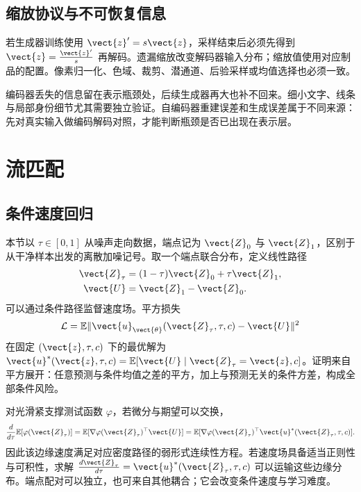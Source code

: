 \documentclass[../textbook.tex]{subfiles}
\begin{document}
\subsection{缩放协议与不可恢复信息}
若生成器训练使用 $\vect{z}'=s\vect{z}$，采样结束后必须先得到 $\vect{z}=\frac{\vect{z}'}{s}$ 再解码。遗漏缩放改变解码器输入分布；缩放值使用对应制品的配置。像素归一化、色域、裁剪、潜通道、后验采样或均值选择也必须一致。

编码器丢失的信息留在表示瓶颈处，后续生成器再大也补不回来。细小文字、线条与局部身份细节尤其需要独立验证。自编码器重建误差和生成误差属于不同来源：先对真实输入做编码解码对照，才能判断瓶颈是否已出现在表示层。

\section{流匹配}
\optional
\subsection{条件速度回归}
本节以 $\tau\in[0,1]$ 从噪声走向数据，端点记为 $\vect{Z}_0$ 与 $\vect{Z}_1$，区别于从干净样本出发的离散加噪记号。取一个端点联合分布，定义线性路径
\begin{equation}
 \begin{aligned}
  \vect{Z}_\tau &= (1-\tau)\vect{Z}_0+\tau \vect{Z}_1, \\
  \vect{U} &= \vect{Z}_1-\vect{Z}_0.
 \end{aligned}
\end{equation}
可以通过条件路径监督速度场\cite{lipman2023flowmatching}。平方损失
\begin{equation}
 \mathcal L=\mathbb E\|\vect{u}_{\vect{\theta}}(\vect{Z}_\tau,\tau,c)-\vect{U}\|^2
\end{equation}
在固定 $(\vect{z},\tau,c)$ 下的最优解为 $\vect{u}^*(\vect{z},\tau,c)=\mathbb E[\vect{U}\mid \vect{Z}_\tau=\vect{z},c]$。证明来自平方展开：任意预测与条件均值之差的平方，加上与预测无关的条件方差，构成全部条件风险。

对光滑紧支撑测试函数 $\varphi$，若微分与期望可以交换，
\begin{equation}
 \frac{d}{d\tau}\mathbb E[\varphi(\vect{Z}_\tau)]
 =\mathbb E[\nabla\varphi(\vect{Z}_\tau)^\top \vect{U}]
 =\mathbb E[\nabla\varphi(\vect{Z}_\tau)^\top \vect{u}^*(\vect{Z}_\tau,\tau,c)].
\end{equation}
因此该边缘速度满足对应密度路径的弱形式连续性方程。若速度场具备适当正则性与可积性，求解 $\frac{d\vect{Z}_\tau}{d\tau}=\vect{u}^*(\vect{Z}_\tau,\tau,c)$ 可以运输这些边缘分布。端点配对可以独立，也可来自其他耦合；它会改变条件速度与学习难度。
\end{document}
